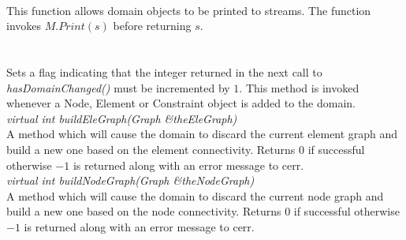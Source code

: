 \\  
This function allows domain objects to be printed to streams. The
function invokes $M.Print(s)$ before returning $s$. \\

  \\
\\
Sets a flag indicating that the integer returned in the next call to 
{\em hasDomainChanged()} must be incremented by $1$. This method is
invoked whenever a Node, Element or Constraint object is added to the
domain. \\ 

{\em virtual int buildEleGraph(Graph \&theEleGraph)} \\
A method which will cause the domain to discard the current element
graph and build a new one based on the element connectivity. Returns
$0$ if successful otherwise $-1$ is returned along with an error
message to cerr. \\

{\em virtual int buildNodeGraph(Graph \&theNodeGraph)} \\
A method which will cause the domain to discard the current node
graph and build a new one based on the node connectivity. Returns
$0$ if successful otherwise $-1$ is returned along with an error
message to cerr. \\





